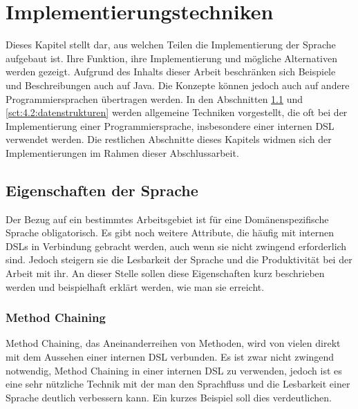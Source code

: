 
\chapter{Implementierungstechniken}\label{chp:4:implementierungstechniken}
Dieses Kapitel stellt dar, aus welchen Teilen die Implementierung der Sprache aufgebaut ist. Ihre Funktion, ihre Implementierung und mögliche Alternativen werden gezeigt. Aufgrund des Inhalts dieser Arbeit beschränken sich Beispiele und Beschreibungen auch auf Java. Die Konzepte können jedoch auch auf andere Programmiersprachen übertragen werden. In den Abschnitten \ref{sct:4.1:eigenschaften} und \ref{sct:4.2:datenstrukturen} werden allgemeine Techniken vorgestellt, die oft bei der Implementierung einer Programmiersprache, insbesondere einer internen DSL verwendet werden. Die restlichen Abschnitte dieses Kapitels widmen sich der Implementierungen im Rahmen dieser Abschlussarbeit.

\section{Eigenschaften der Sprache}\label{sct:4.1:eigenschaften}
Der Bezug auf ein bestimmtes Arbeitsgebiet ist für eine Domänenspezifische Sprache obligatorisch. Es gibt noch weitere Attribute, die häufig mit internen DSLs in Verbindung gebracht werden, auch wenn sie nicht zwingend erforderlich sind. Jedoch steigern sie die Lesbarkeit der Sprache und die Produktivität bei der Arbeit mit ihr. An dieser Stelle sollen diese Eigenschaften kurz beschrieben werden und beispielhaft erklärt werden, wie man sie erreicht.

\subsection{Method Chaining}\label{ssct:4.1.1:chaining}
Method Chaining, das Aneinanderreihen von Methoden, wird von vielen direkt mit dem Aussehen einer internen DSL verbunden. Es ist zwar nicht zwingend notwendig, Method Chaining in einer internen DSL zu verwenden, jedoch ist es eine sehr nützliche Technik mit der man den Sprachfluss und die Lesbarkeit einer Sprache deutlich verbessern kann\cite{book:fowlerDSL}. Ein kurzes Beispiel soll dies verdeutlichen.

